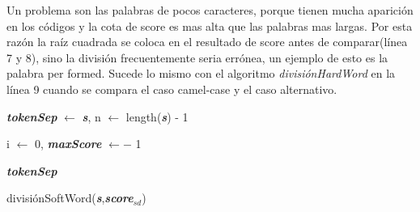\documentclass[a4paper,12pt]{report}
\begin{document}
Un problema son las palabras de pocos caracteres, porque tienen mucha aparición en los códigos y la cota de score es mas alta que las palabras mas largas. Por esta razón la raíz cuadrada se coloca en el resultado de score antes de comparar(línea 7 y 8), sino la división frecuentemente seria errónea, un ejemplo de esto es la palabra \textsf{per formed}. Sucede lo mismo con el algoritmo \textit{divisiónHardWord} en la línea 9 cuando se compara el caso camel-case y el caso alternativo.

\begin{algorithm}[H]
\LinesNumbered%
\BlankLine%

\textbf{\textit{tokenSep}} $\leftarrow$ \textbf{\textit{s}}, n $\leftarrow$ length(\textbf{\textit{s}}) - 1

i $\leftarrow$ 0, \textbf{\textit{maxScore}} $\leftarrow -$ 1
\BlankLine

\BlankLine
\Return \textbf{\textit{tokenSep}}

\caption{divisiónSoftWord(\textbf{\textit{s}},\textbf{\textit{score$_{sd}$}}) \label{ASW}}
\end{algorithm}
\end{document}
